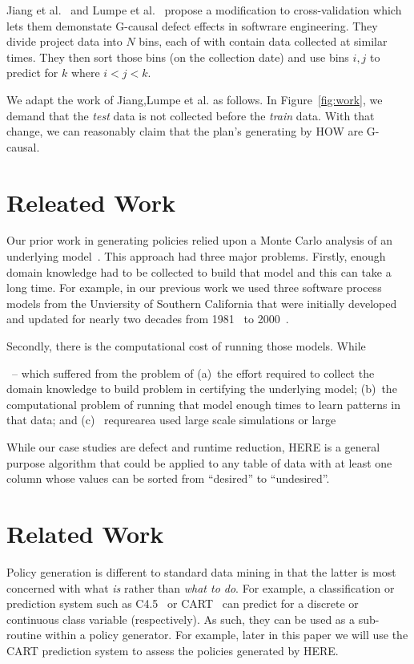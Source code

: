 \documentclass[conference]{IEEEtran}
\newcommand{\fig}[1]{Figure~\ref{fig:#1}}
\begin{document}
Jiang et al.~\cite{me11f} and Lumpe et al.~\cite{me11f} propose a modification to cross-validation which lets them
demonstate G-causal defect effects in softwrare engineering.
They divide project data  into $N$ bins, each of with contain data collected at similar times.
They then sort those bins (on the collection date) and use bins $i,j$ to predict for $k$ where 
$i<j<k$. 

We adapt the work of Jiang,Lumpe et al.  as follows. In  \fig{work}, we demand that the {\em test}
data is not collected before the {\em train} data.  With that change,
we can reasonably claim that the plan's generating by HOW are G-causal.

\section{Releated Work}

Our prior work in generating policies relied upon a Monte Carlo
analysis of an underlying model~\cite{me07f}. This approach had three major problems.
Firstly, enough domain knowledge had to be collected to build that model
and this can take a long time. For example, in our previous work we used three software process models from
the Unviersity of Southern California that were initially
developed and updated for nearly two decades from 1981~\cite{boehm81} to 2000~\cite{boehm00b}.

Secondly, there is the computational cost of running those models.
While 

~\cite{}-- which suffered from the problem of (a)~the effort required to collect the domain knowledge to build
problem in certifying the underlying model;
 (b)~the computational problem of running that model enough
times to learn patterns in that data; and (c)~ requrearea used large scale simulations or large


While
our case studies are defect and runtime reduction, HERE is a general
purpose algorithm that could be applied to any table of data with at least
one column whose values can be sorted from ``desired'' to ``undesired''.

\section{Related Work}
Policy generation is different to standard data mining in that the 
latter is most concerned with what {\em is} rather than {\em what to do}.
For example, a classification or prediction system such as C4.5~\cite{quinlan92} or CART~\cite{breiman84} can predict for a discrete or continuous class variable
(respectively). As such, they can be used as a sub-routine within a
policy generator. For example, later in this paper we will use the CART
prediction system to assess the policies generated by HERE.
\end{document}
